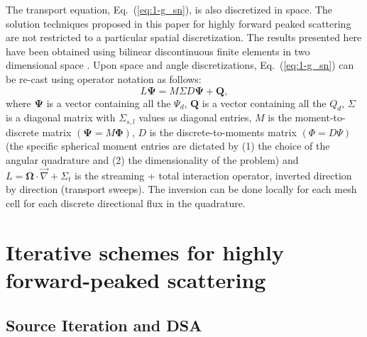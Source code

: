 \documentclass[preprint,10pt]{elsarticle}
\newcommand\bo{\boldsymbol{\Omega}}
\newcommand\bs{\boldsymbol}
\renewcommand{\(}{\left(}
\renewcommand{\)}{\right)}
\renewcommand{\[}{\left[}
\renewcommand{\]}{\right]}
\newcommand{\grad}{\vec{\nabla}}
\newcommand{\eqt}[1]{Eq.~(\ref{#1})}                     %
\begin{document}
The transport equation, \eqt{eq:1-g_sn}, is also discretized in space. The solution techniques proposed
in this paper for highly forward peaked scattering are not restricted to a 
particular spatial discretization. The results presented here have been obtained 
using bilinear discontinuous finite elements in two dimensional space \cite{dgfem}.
Upon space and angle discretizations, \eqt{eq:1-g_sn} can be re-cast using operator notation as follows:
%
\begin{equation}
L \bs{\Psi} = M\Sigma D \bs{\Psi} + \bs{Q},
\label{eq:operator}
\end{equation}
%
where $\bs{\Psi}$ is a vector containing all the $\Psi_d$, $\bs{Q}$ is a
vector containing all the $Q_d$, $\Sigma$ is a diagonal matrix with 
$\Sigma_{s,l}$ values as diagonal entries, $M$ is the moment-to-discrete
matrix $(\bs{\Psi} = M\bs{\Phi})$, $D$ is the discrete-to-moments matrix
$(\Phi=D\Psi)$ (the specific spherical moment entries are dictated by (1) the choice of 
the angular quadrature and (2) the dimensionality of the problem) and 
$L = \bo\cdot\grad + \Sigma_t$ is the streaming + total interaction operator,
inverted direction by direction (transport sweeps). The inversion can be done
locally for each mesh cell for each discrete directional flux in the
quadrature.\\

\section{Iterative schemes for highly forward-peaked scattering} \label{sec:iterative_scheme}

\subsection{Source Iteration and DSA}
\end{document}

